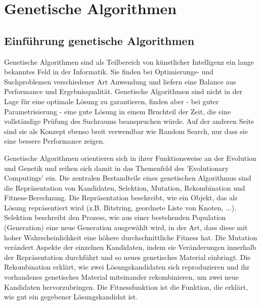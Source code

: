 \section{Genetische Algorithmen}
\label{Sec:GeneticAlgorithms}
\subsection{Einführung genetische Algorithmen}
Genetische Algorithmen sind als Teilbereich von künstlicher Intelligenz ein lange bekanntes Feld in der Informatik. Sie finden bei Optimierungs- und Suchproblemen verschiedener Art Anwendung und liefern eine Balance aus Performance und Ergebnisqualität. Genetische Algorithmen sind nicht in der Lage für eine optimale Lösung zu garantieren, finden aber - bei guter Parametrisierung - eine gute Lösung in einem Bruchteil der Zeit, die eine vollständige Prüfung des Suchraums beanspruchen würde. Auf der anderen Seite sind sie als Konzept ebenso breit verwendbar wie Random Search, nur dass sie eine bessere Performance zeigen.

Genetische Algorithmen orientieren sich in ihrer Funktionsweise an der Evolution und Genetik und reihen sich damit in das  Themenfeld des 'Evolutionary Computings' ein.
Die zentralen Bestandteile eines genetischen Algorithmus sind die Repräsentation von Kandidaten, Selektion, Mutation, Rekombination und Fitness-Berechnung. Die Repräsentation beschreibt, wie ein Objekt, das als Lösung repräsentiert wird (z.B. Bitstring, geordnete Liste von Knoten, ...). Selektion beschreibt den Prozess, wie aus einer bestehenden Population (Generation) eine neue Generation ausgewählt wird, in der Art, dass diese mit hoher Wahrscheinlichkeit eine höhere durchschnittliche Fitness hat. Die Mutation verändert Aspekte der einzelnen Kandidaten, indem sie Veränderungen innerhalb der Repräsentation durchführt und so neues genetisches Material einbringt. Die Rekombination erklärt, wie zwei Lösungskandidaten sich reproduzieren und ihr vorhandenes genetisches Material miteinander rekombinieren, um zwei neue Kandidaten hervorzubringen. Die Fitnessfunktion ist die Funktion, die erklärt, wie gut ein gegebener Lösungskandidat ist.

